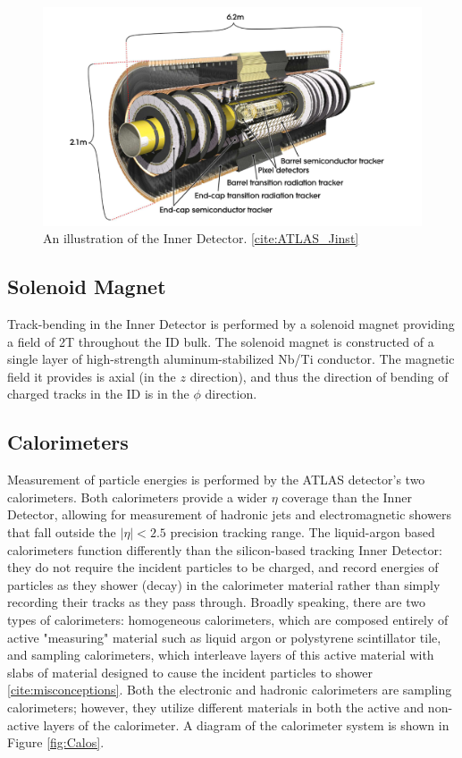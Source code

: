 \begin{figure}
  \includegraphics[width=\linewidth]{figures/detector_chapter/ID.png}
  \caption{An illustration of the Inner Detector. \ref{cite:ATLAS_Jinst}}
  \label{fig:ID}
\end{figure}

\subsection{Solenoid Magnet} \label{sec:solenoid}

Track-bending in the Inner Detector is performed by a solenoid magnet providing a field of 2T throughout the ID bulk. The solenoid magnet is constructed of a single layer of high-strength aluminum-stabilized Nb/Ti conductor. The magnetic field it provides is axial (in the $z$ direction), and thus the direction of bending of charged tracks in the ID is in the $\phi$ direction. 

\subsection{Calorimeters} \label{sec:Calos} 

Measurement of particle energies is performed by the ATLAS detector's two calorimeters. Both calorimeters provide a wider $\eta$ coverage than the Inner Detector, allowing for measurement of hadronic jets and electromagnetic showers that fall outside the $|\eta| < 2.5$ precision tracking range. The liquid-argon based calorimeters function differently than the silicon-based tracking Inner Detector: they do not require the incident particles to be charged, and record energies of particles as they shower (decay) in the calorimeter material rather than simply recording their tracks as they pass through. Broadly speaking, there are two types of calorimeters: homogeneous calorimeters, which are composed entirely of active "measuring" material such as liquid argon or polystyrene scintillator tile, and sampling calorimeters, which interleave layers of this active material with slabs of material designed to cause the incident particles to shower \ref{cite:misconceptions}. Both the electronic and hadronic calorimeters are sampling calorimeters; however, they utilize different materials in both the active and non-active layers of the calorimeter. A diagram of the calorimeter system is shown in Figure \ref{fig:Calos}.

